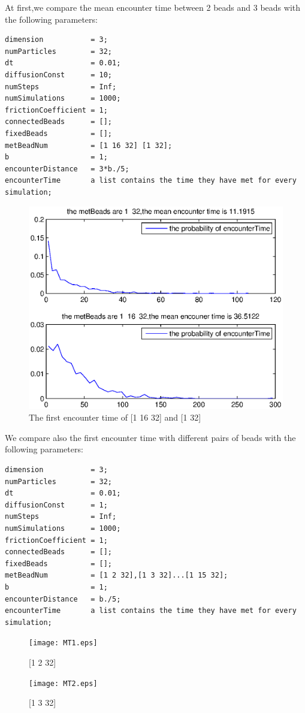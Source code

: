 \documentclass{article}
\begin{document}
At first,we compare the mean encounter time between 2 beads and 3 beads with the following parameters:
\pagebreak
\begin{lstlisting}
dimension           = 3;
numParticles        = 32;
dt                  = 0.01;
diffusionConst      = 10;
numSteps            = Inf;
numSimulations      = 1000;
frictionCoefficient = 1;
connectedBeads      = [];
fixedBeads          = [];
metBeadNum          = [1 16 32] [1 32];
b                   = 1;
encounterDistance   = 3*b./5;
encounterTime       a list contains the time they have met for every simulation;      
\end{lstlisting}
\begin{figure}[H]
	\includegraphics[width=6.2in]{MetTimeN.eps}
	\caption{The first encounter time of [1 16 32] and [1 32]}
\end{figure}
\pagebreak
We compare also the first encounter time with different pairs of beads with the following parameters:\\
\begin{lstlisting}
dimension           = 3;
numParticles        = 32;
dt                  = 0.01;
diffusionConst      = 1;
numSteps            = Inf;
numSimulations      = 1000;
frictionCoefficient = 1;
connectedBeads      = [];
fixedBeads          = [];
metBeadNum          = [1 2 32],[1 3 32]...[1 15 32];
b                   = 1;
encounterDistance   = b./5;
encounterTime       a list contains the time they have met for every simulation;      
\end{lstlisting}
\begin{figure}[H]
	\begin{minipage}[t]{0.5\textwidth}
		\centering
		\texttt{[image: MT1.eps]}
			\caption{[1 2 32]}
		\end{minipage}%
		\begin{minipage}[t]{1.0\textwidth}
			\centering
			\texttt{[image: MT2.eps]}
				\caption{[1 3 32]}
			\end{minipage}
		\end{figure}
\end{document}
